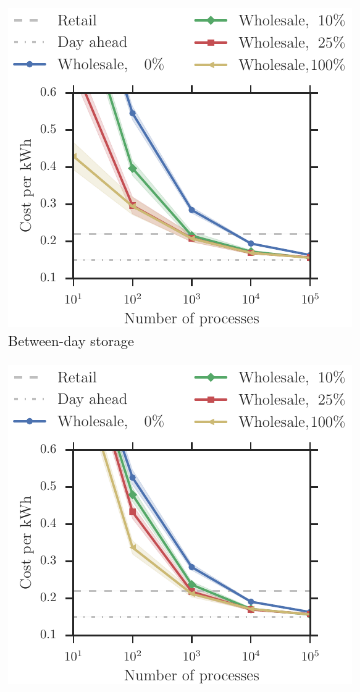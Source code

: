 \documentclass[conference]{IEEEtran}
\begin{document}
\begin{figure}[t!]
\begin{subfigure}[b]{0.32\textwidth}
	\includegraphics[width=1.0\textwidth, clip=true, trim=0 0 0 2cm]{figures/Wholesale.pdf}
        \caption{Between-day storage}
        \label{fig:wholesale}
    \end{subfigure}
   	\begin{subfigure}[b]{0.32\textwidth}
	\includegraphics[width=1.0\textwidth, clip=true, trim=0 0 0 2cm]{figures/Wholesale_flex.pdf}

\end{subfigure}
\end{figure}
\end{document}
